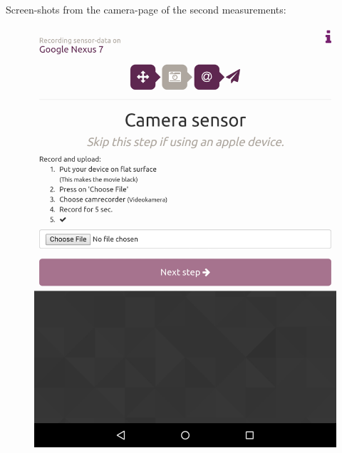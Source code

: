 Screen-shots from the camera-page of the second measurements:
\begin{figure}[!htb]
  \hspace{-2cm}
  \centering
  \begin{minipage}[c]{.23\textwidth}
    \centering
    \includegraphics[scale=0.15]{img/sensorrec-nexus-3-cam}
  \end{minipage}
  \hspace{2cm}
  \begin{minipage}[c]{.23\textwidth}
    \centering

\end{minipage}
\end{figure}
